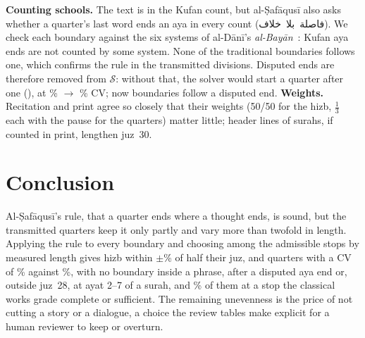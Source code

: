 \documentclass[conference]{IEEEtran}
\newcommand{\ar}[1]{\mbox{\textarabic{#1}}}
\begin{document}
\textbf{Counting schools.} The text is in the Kufan count, but al-Ṣafāqusī also asks whether a
quarter's last word ends an aya in every count (\ar{فاصلة بلا خلاف}). We check each boundary
against the six systems of al-Dānī's \emph{al-Bayān}~\cite{bayan,qiraatmap}: \DisputedEnds{} Kufan
aya ends are not counted by some system. None of the \TradBoundaries{} traditional boundaries
follows one, which confirms the rule in the transmitted divisions. Disputed ends are therefore removed
from $\mathcal{S}$: without that, the solver would start a quarter after one (\CountMovedList),
at \CountFreeRubCV\% $\to$ \NewRubCV\% CV; now \NewDisputed{} boundaries follow a disputed end.
\textbf{Weights.} Recitation and
print agree so closely that their weights (50/50 for the hizb, $\tfrac13$ each with the pause for the
quarters) matter little; header lines of surahs, if counted in
print, lengthen juz~30.

\section{Conclusion}
Al-Ṣafāqusī's rule, that a quarter ends where a thought ends, is sound, but the transmitted
quarters keep it only partly and vary more than twofold in length. Applying the rule to every
boundary and choosing among the admissible stops by measured length gives hizb within
$\pm$\NewHizbWorst\% of half their juz, and quarters with a CV of \NewRubCV\% against
\TradRubCV\%, with no boundary inside a phrase, after a disputed aya end or, outside juz~28, at ayat 2--7 of a surah, and \GradeNewStrong\% of them at a stop the classical works grade complete or sufficient. The remaining unevenness
is the price of not cutting a story or a dialogue, a choice the review tables make explicit
for a human reviewer to keep or overturn.
\end{document}
